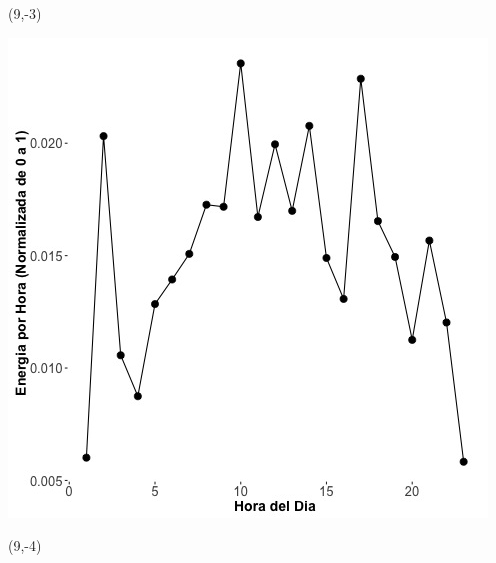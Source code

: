 \documentclass{article}\usepackage[]{graphicx}\usepackage[]{color}
\newenvironment{knitrout}{}{} %
\begin{document}
 \begin{textblock}{1}(9,-3)
\begin{minipage}{20em}
\begingroup

\endgroup
\end{minipage}
\end{textblock}

 \vspace{2cm}

\begin{knitrout}
\color{fgcolor}
\includegraphics[scale=0.75]{figure/A1_fplot_norm_median} 
\end{knitrout}


 \begin{textblock}{1}(9,-4)
\begin{minipage}{20em}
\begingroup

\endgroup
\end{minipage}
\end{textblock}

 \vspace{2cm}
\end{document}
